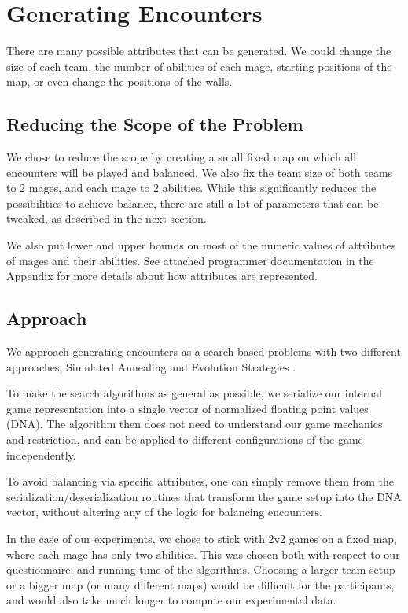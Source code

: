 \chapter{Generating Encounters}
\label{chapter04}

There are many possible attributes that can be generated. We could change the size of each team,
the number of abilities of each mage, starting positions of the map, or even change the positions of the walls.

\section{Reducing the Scope of the Problem}

We chose to reduce the scope by creating a small fixed map on which all encounters will be played and balanced.
We also fix the team size of both teams to 2 mages, and each mage to 2 abilities. While this significantly reduces
the possibilities to achieve balance, there are still a lot of parameters that can be tweaked, as described in the next section.

We also put lower and upper bounds on most of the numeric values of attributes of mages and their abilities.
See attached programmer documentation in the Appendix  for more details about how attributes are represented.

\section{Approach}

We approach generating encounters as a search based problems with two different
approaches, Simulated Annealing \citep{ai-modern} and Evolution Strategies
\citep{evolution-strategies}.

To make the search algorithms as general as possible, we serialize our
internal game representation into a single vector of normalized floating
point values (DNA). The algorithm then does not need to understand our game
mechanics and restriction, and can be applied to different configurations of
the game independently.

To avoid balancing via specific attributes, one can simply remove them from
the serialization/deserialization routines that transform the game setup into
the DNA vector, without altering any of the logic for balancing encounters.

In the case of our experiments, we chose to stick with 2v2 games on a fixed map,
where each mage has only two abilities. This was chosen both with respect to our
questionnaire, and running time of the algorithms. Choosing a larger team setup or
a bigger map (or many different maps) would be difficult for the participants,
and would also take much longer to compute our experimental data.

